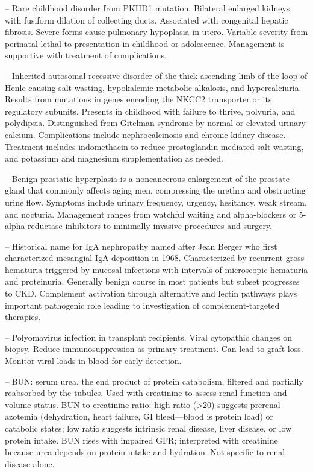 -- Rare childhood disorder from PKHD1 mutation. Bilateral enlarged kidneys with fusiform dilation of collecting ducts. Associated with congenital hepatic fibrosis. Severe forms cause pulmonary hypoplasia in utero. Variable severity from perinatal lethal to presentation in childhood or adolescence. Management is supportive with treatment of complications.

-- Inherited autosomal recessive disorder of the thick ascending limb of the loop of Henle causing salt wasting, hypokalemic metabolic alkalosis, and hypercalciuria. Results from mutations in genes encoding the NKCC2 transporter or its regulatory subunits. Presents in childhood with failure to thrive, polyuria, and polydipsia. Distinguished from Gitelman syndrome by normal or elevated urinary calcium. Complications include nephrocalcinosis and chronic kidney disease. Treatment includes indomethacin to reduce prostaglandin-mediated salt wasting, and potassium and magnesium supplementation as needed.

-- Benign prostatic hyperplasia is a noncancerous enlargement of the prostate gland that commonly affects aging men, compressing the urethra and obstructing urine flow. Symptoms include urinary frequency, urgency, hesitancy, weak stream, and nocturia. Management ranges from watchful waiting and alpha-blockers or 5-alpha-reductase inhibitors to minimally invasive procedures and surgery.

-- Historical name for IgA nephropathy named after Jean Berger who first characterized mesangial IgA deposition in 1968. Characterized by recurrent gross hematuria triggered by mucosal infections with intervals of microscopic hematuria and proteinuria. Generally benign course in most patients but subset progresses to CKD. Complement activation through alternative and lectin pathways plays important pathogenic role leading to investigation of complement-targeted therapies.

-- Polyomavirus infection in transplant recipients. Viral cytopathic changes on biopsy. Reduce immunosuppression as primary treatment. Can lead to graft loss. Monitor viral loads in blood for early detection.

-- BUN: serum urea, the end product of protein catabolism, filtered and partially reabsorbed by the tubules. Used with creatinine to assess renal function and volume status. BUN-to-creatinine ratio: high ratio (>20) suggests prerenal azotemia (dehydration, heart failure, GI bleed—blood is protein load) or catabolic states; low ratio suggests intrinsic renal disease, liver disease, or low protein intake. BUN rises with impaired GFR; interpreted with creatinine because urea depends on protein intake and hydration. Not specific to renal disease alone.

